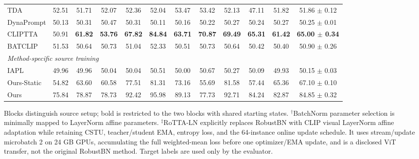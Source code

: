 \begin{table}[t]
{\begin{tabular}{lccccccccccc}
TDA & 52.51 & 51.71 & 52.07 & 52.36 & 52.04 & 53.47 & 53.42 & 52.13 & 47.11 & 51.82 & 51.86 $\pm$ 0.12 \\
DynaPrompt & 50.13 & 50.31 & 50.47 & 50.31 & 50.11 & 50.16 & 50.22 & 50.27 & 50.24 & 50.27 & 50.25 $\pm$ 0.01 \\
CLIPTTA & 50.91 & \textbf{61.82} & \textbf{53.76} & \textbf{67.82} & \textbf{84.84} & \textbf{63.71} & \textbf{70.87} & \textbf{69.49} & \textbf{65.31} & \textbf{61.42} & \textbf{65.00 $\pm$ 0.34} \\
BATCLIP & 51.53 & 50.64 & 50.73 & 51.04 & 52.33 & 50.51 & 50.73 & 50.64 & 50.42 & 50.40 & 50.90 $\pm$ 0.26 \\
\midrule
\multicolumn{12}{l}{\textit{Method-specific source training}} \\
IAPL & 49.96 & 49.96 & 50.04 & 50.04 & 50.51 & 50.00 & 50.67 & 50.27 & 50.09 & 49.93 & 50.15 $\pm$ 0.03 \\
Ours-Static & 54.82 & 63.60 & 60.58 & 77.51 & 81.31 & 73.16 & 55.69 & 81.58 & 57.44 & 65.36 & 67.10 $\pm$ 0.10 \\
Ours & 75.84 & 78.87 & 78.73 & 92.42 & 95.98 & 89.13 & 77.73 & 92.71 & 84.24 & 82.87 & 84.85 $\pm$ 0.32 \\
\bottomrule
\end{tabular}%
}
\vspace{2pt}
\parbox{\textwidth}{\footnotesize Blocks distinguish source setup; bold is restricted to the two blocks with shared starting states. $^{\dagger}$BatchNorm parameter selection is minimally mapped to LayerNorm affine parameters. $^{\ddagger}$RoTTA-LN explicitly replaces RobustBN with CLIP visual LayerNorm affine adaptation while retaining CSTU, teacher/student EMA, entropy loss, and the 64-instance online update schedule. It uses stream/update microbatch 2 on 24 GB GPUs, accumulating the full weighted-mean loss before one optimizer/EMA update, and is a disclosed ViT transfer, not the original RobustBN method. Target labels are used only by the evaluator.}
\end{table}
